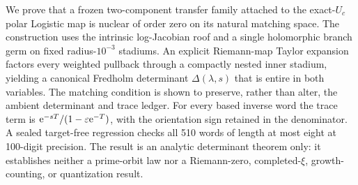 We prove that a frozen two-component transfer family attached to the
exact-\(U_c\) polar Logistic map is nuclear of order zero on its natural
matching space. The construction uses the intrinsic log-Jacobian roof and a
single holomorphic branch germ on fixed radius-\(10^{-3}\) stadiums. An
explicit Riemann-map Taylor expansion factors every weighted pullback through
a compactly nested inner stadium, yielding a canonical Fredholm determinant
\(\Delta(\lambda,s)\) that is entire in both variables. The matching
condition is shown to preserve, rather than alter, the ambient determinant
and trace ledger. For every based inverse word the trace term is
\(\mathrm{e}^{-sT}/(1-\varepsilon\mathrm{e}^{-T})\), with the orientation sign retained in
the denominator. A sealed target-free regression checks all 510 words of
length at most eight at 100-digit precision. The result is an analytic
determinant theorem only: it establishes neither a prime-orbit law nor a
Riemann-zero, completed-\(\xi\), growth-counting, or quantization result.
